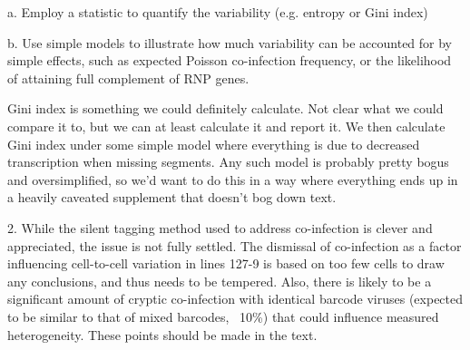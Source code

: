 \documentclass[11pt, oneside]{article}   	%
\begin{document}
    a. Employ a statistic to quantify the variability (e.g. entropy or Gini index) 

    b. Use simple models to illustrate how much variability can be accounted for by simple effects, such as expected Poisson co-infection frequency, or the likelihood of attaining full complement of RNP genes. 
    
{\color{red}
Gini index is something we could definitely calculate. Not clear what we could compare it to, but we can at least calculate it and report it.
We then calculate Gini index under some simple model where everything is due to decreased transcription when missing segments.
Any such model is probably pretty bogus and oversimplified, so we'd want to do this in a way where everything ends up in a heavily caveated supplement that doesn't bog down text.
}


2. While the silent tagging method used to address co-infection is clever and appreciated, the issue is not fully settled. The dismissal of co-infection as a factor influencing cell-to-cell variation in lines 127-9 is based on too few cells to draw any conclusions, and thus needs to be tempered. Also, there is likely to be a significant amount of cryptic co-infection with identical barcode viruses (expected to be similar to that of mixed barcodes, ~10\%) that could influence measured heterogeneity. These points should be made in the text. 
\end{document}
